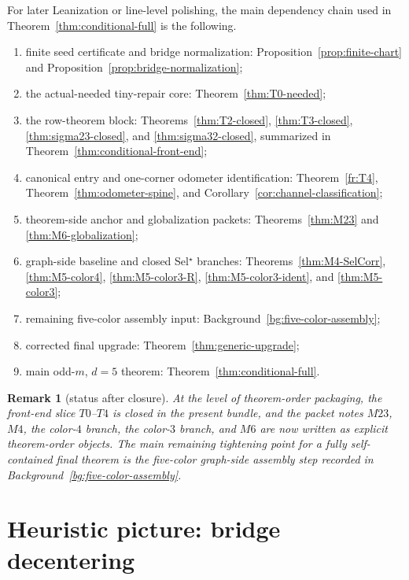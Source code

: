 \documentclass[11pt]{article}
\newtheorem{remark}[theorem]{Remark}
\begin{document}
For later Leanization or line-level polishing, the main dependency chain used in
Theorem~\ref{thm:conditional-full} is the following.
\begin{enumerate}[label=\textup{(D\arabic*)},leftmargin=3.0em]
\item finite seed certificate and bridge normalization:
      Proposition~\ref{prop:finite-chart} and
      Proposition~\ref{prop:bridge-normalization};
\item the actual-needed tiny-repair core:
      Theorem~\ref{thm:T0-needed};
\item the row-theorem block:
      Theorems~\ref{thm:T2-closed}, \ref{thm:T3-closed},
      \ref{thm:sigma23-closed}, and \ref{thm:sigma32-closed}, summarized in
      Theorem~\ref{thm:conditional-front-end};
\item canonical entry and one-corner odometer identification:
      Theorem~\ref{fr:T4}, Theorem~\ref{thm:odometer-spine}, and
      Corollary~\ref{cor:channel-classification};
\item theorem-side anchor and globalization packets:
      Theorems~\ref{thm:M23} and \ref{thm:M6-globalization};
\item graph-side baseline and closed Sel\(^{\star}\) branches:
      Theorems~\ref{thm:M4-SelCorr}, \ref{thm:M5-color4},
      \ref{thm:M5-color3-R}, \ref{thm:M5-color3-ident}, and
      \ref{thm:M5-color3};
\item remaining five-color assembly input:
      Background~\ref{bg:five-color-assembly};
\item corrected final upgrade:
      Theorem~\ref{thm:generic-upgrade};
\item main odd-$m$, $d=5$ theorem:
      Theorem~\ref{thm:conditional-full}.
\end{enumerate}

\begin{remark}[status after closure]
At the level of theorem-order packaging, the front-end slice $T0$--$T4$ is
closed in the present bundle, and the packet notes \(M23\), \(M4\), the
color-$4$ branch, the color-$3$ branch, and \(M6\) are now written as explicit
theorem-order objects.
The main remaining tightening point for a fully self-contained final theorem is
the five-color graph-side assembly step recorded in
Background~\ref{bg:five-color-assembly}.
\end{remark}

\section{Heuristic picture: bridge decentering}
\end{document}
